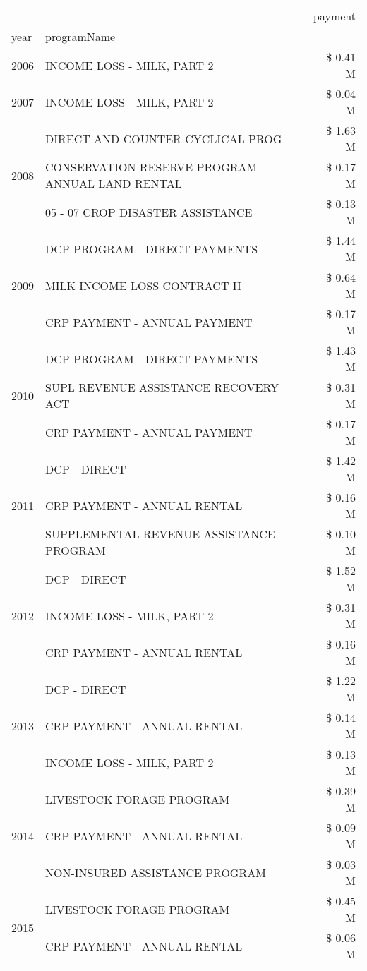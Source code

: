 \begin{tabular}{llr}
\toprule
 &  & payment \\
year & programName &  \\
\midrule
2006 & INCOME LOSS - MILK, PART 2 & \$ 0.41 M \\
\cline{1-3}
2007 & INCOME LOSS - MILK, PART 2 & \$ 0.04 M \\
\cline{1-3}
\multirow[t]{3}{*}{2008} & DIRECT AND COUNTER CYCLICAL PROG & \$ 1.63 M \\
 & CONSERVATION RESERVE PROGRAM - ANNUAL LAND RENTAL & \$ 0.17 M \\
 & 05 - 07 CROP DISASTER ASSISTANCE & \$ 0.13 M \\
\cline{1-3}
\multirow[t]{3}{*}{2009} & DCP PROGRAM - DIRECT PAYMENTS & \$ 1.44 M \\
 & MILK INCOME LOSS CONTRACT II & \$ 0.64 M \\
 & CRP PAYMENT - ANNUAL PAYMENT & \$ 0.17 M \\
\cline{1-3}
\multirow[t]{3}{*}{2010} & DCP PROGRAM - DIRECT PAYMENTS & \$ 1.43 M \\
 & SUPL REVENUE ASSISTANCE RECOVERY ACT & \$ 0.31 M \\
 & CRP PAYMENT - ANNUAL PAYMENT & \$ 0.17 M \\
\cline{1-3}
\multirow[t]{3}{*}{2011} & DCP - DIRECT & \$ 1.42 M \\
 & CRP PAYMENT - ANNUAL RENTAL & \$ 0.16 M \\
 & SUPPLEMENTAL REVENUE ASSISTANCE PROGRAM & \$ 0.10 M \\
\cline{1-3}
\multirow[t]{3}{*}{2012} & DCP - DIRECT & \$ 1.52 M \\
 & INCOME LOSS - MILK, PART 2 & \$ 0.31 M \\
 & CRP PAYMENT - ANNUAL RENTAL & \$ 0.16 M \\
\cline{1-3}
\multirow[t]{3}{*}{2013} & DCP - DIRECT & \$ 1.22 M \\
 & CRP PAYMENT - ANNUAL RENTAL & \$ 0.14 M \\
 & INCOME LOSS - MILK, PART 2 & \$ 0.13 M \\
\cline{1-3}
\multirow[t]{3}{*}{2014} & LIVESTOCK FORAGE PROGRAM & \$ 0.39 M \\
 & CRP PAYMENT - ANNUAL RENTAL & \$ 0.09 M \\
 & NON-INSURED ASSISTANCE PROGRAM & \$ 0.03 M \\
\cline{1-3}
\multirow[t]{3}{*}{2015} & LIVESTOCK FORAGE PROGRAM & \$ 0.45 M \\
 & CRP PAYMENT - ANNUAL RENTAL & \$ 0.06 M \\

\end{tabular}
